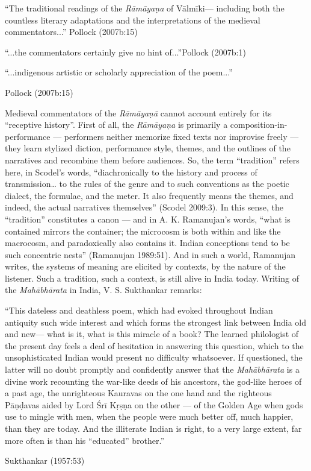 \begin{myquote}
“The traditional readings of the {\sl Rāmāyaṇa} of Vālmīki--- including both the countless literary adaptations and the interpretations of the medieval commentators...”
\hfill	Pollock (2007b:15)

\smallskip

“...the commentators certainly give no hint of...”\hfill  Pollock (2007b:1)
	
“...indigenous artistic or scholarly appreciation of the poem...''

\hfill  Pollock (2007b:15)
\end{myquote}

Medieval commentators of the {\sl Rāmāyaṇā} cannot account entirely for its “receptive history”. First of all, the {\sl Rāmāyaṇa} is primarily a composition-in-performance --- performers neither memorize fixed texts nor improvise freely --- they learn stylized diction, performance style, themes, and the outlines of the narratives and recombine them before audiences.  So, the term “tradition” refers here, in Scodel’s words, “diachronically to the history and process of transmission… to the rules of the genre and to such conventions as the poetic dialect, the formulae, and the meter. It also frequently means the themes, and indeed, the actual narratives themselves” (Scodel 2009:3). In this sense, the “tradition” constitutes a canon --- and in A. K. Ramanujan’s words, “what is contained mirrors the container; the microcosm is both within and like the macrocosm, and paradoxically also contains it. Indian conceptions tend to be such concentric nests” (Ramanujan 1989:51). And in such a world, Ramanujan writes, the systems of meaning are elicited by contexts, by the nature of the listener. Such a tradition, such a context, is still alive in India today. Writing of the {\sl Mahābhārata} in India, V. S. Sukthankar remarks:

\begin{myquote}
“This dateless and deathless poem, which had evoked throughout Indian antiquity such wide interest and which forms the strongest link between India old and new--- what is it, what is this miracle of a book? The learned philologist of the present day feels a deal of hesitation in answering this question, which to the unsophisticated Indian would present no difficulty whatsoever. If questioned, the latter will no doubt promptly and confidently answer that the {\sl Mahābhārata} is a divine work recounting the war-like deeds of his ancestors, the god-like heroes of a past age, the unrighteous Kauravas on the one hand and the righteous Pāṇḍavas aided by Lord Śrī Kṛṣṇa on the other --- of the Golden Age when gods use to mingle with men, when the people were much better off, much happier, than they are today. And the illiterate Indian is right, to a very large extent, far more often is than his “educated” brother.” 

\hfill	Sukthankar (1957:53)
\end{myquote}


